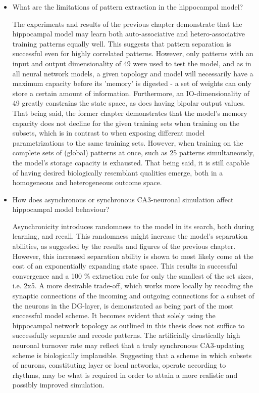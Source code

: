 
\begin{itemize}
    \item What are the limitations of pattern extraction in the hippocampal model?
    
    The experiments and results of the previous chapter demonstrate that the hippocampal model may learn both auto-associative and hetero-associative training patterns equally well. This suggests that pattern separation is successful even for highly correlated patterns. However, only patterns with an input and output dimensionality of 49 were used to test the model, and as in all neural network models, a given topology and model will necessarily have a maximum capacity before its 'memory' is digested - a set of weights can only store a certain amount of information. Furthermore, an IO-dimensionality of 49 greatly constrains the state space, as does having bipolar output values. That being said, the former chapter demonstrates that the model's memory capacity does not decline for the given training sets when training on the subsets, which is in contrast to when exposing different model parametrizations to the same training sets. However, when training on the complete sets of (global) patterns at once, such as 25 patterns simultaneously, the model's storage capacity is exhausted.
    That being said, it is still capable of having desired biologically resemblant qualities emerge, both in a homogeneous and heterogeneous outcome space.
    
    \item How does asynchronous or synchronous CA3-neuronal simulation affect hippocampal model behaviour?
    
    Asynchronicity introduces randomness to the model in its search, both during learning, and recall. This randomness might increase the model's separation abilities, as suggested by the results and figures of the previous chapter. However, this increased separation ability is shown to most likely come at the cost of an exponentially expanding state space. This results in successful convergence and a 100 \% extraction rate for only the smallest of the set sizes, i.e. 2x5. A more desirable trade-off, which works more locally by recoding the synaptic connections of the incoming and outgoing connections for a subset of the neurons in the DG-layer, is demonstrated as being part of the most successful model scheme. It becomes evident that solely using the hippocampal network topology as outlined in this thesis does not suffice to successfully separate and recode patterns. The artificially drastically high neuronal turnover rate may reflect that a truly synchronous CA3-updating scheme is biologically implausible. Suggesting that a scheme in which subsets of neurons, constituting layer or local networks, operate according to rhythms, may be what is required in order to attain a more realistic and possibly improved simulation.
    

\end{itemize}
